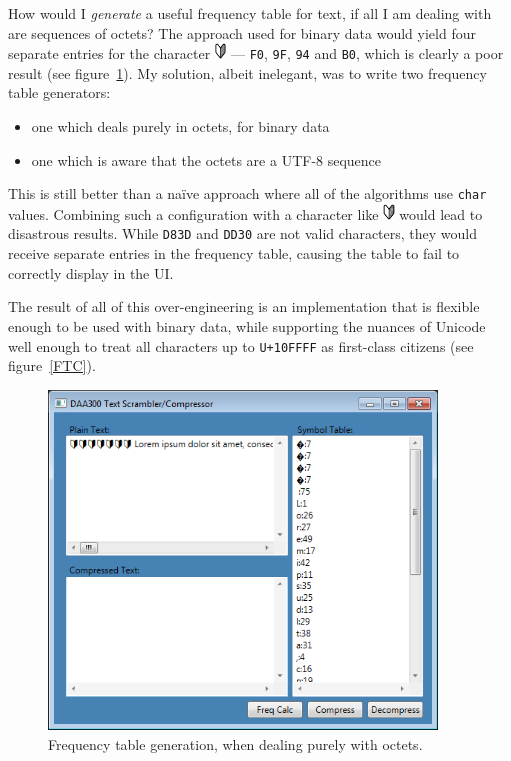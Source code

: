 \documentclass[a4paper,titlepage,12pt]{article}
\begin{document}
How would I \emph{generate} a useful frequency table for text, if all I am
dealing with are sequences of octets? The approach used for binary data would
yield four separate entries for the character \includegraphics[height=12pt]
{U+01F530.png} --- \texttt{F0}, \texttt{9F}, \texttt{94} and \texttt{B0}, which
is clearly a poor result (see figure~\ref{FTO}). My solution, albeit
inelegant, was to write two frequency table generators:

\begin{itemize}
	\item
		one which deals purely in octets, for binary data
	\item
		one which is aware that the octets are a UTF-8 sequence
\end{itemize}

This is still better than a naïve approach where all of the algorithms use
\texttt{char} values. Combining such a configuration with a character like
\includegraphics[height=12pt]{U+01F530.png} would lead to disastrous results.
While \texttt{D83D} and \texttt{DD30} are not valid characters, they would
receive separate entries in the frequency table, causing the table to fail to
correctly display in the UI.

The result of all of this over-engineering is an implementation that is
flexible enough to be used with binary data, while supporting the nuances of
Unicode well enough to treat all characters up to \texttt{U+10FFFF} as
first-class citizens (see figure~\ref{FTC}).

\begin{center}
\begin{figure}[b]
	\begin{center}
		\includegraphics[height=9cm]{FTO.png}
	\end{center}
	\caption{
		Frequency table generation, when dealing purely with octets.
	}
	\label{FTO}
\end{figure}
\end{center}
\end{document}
